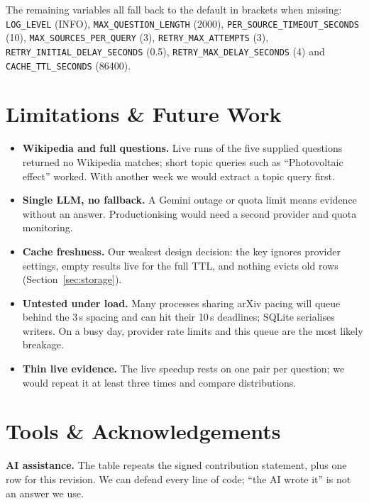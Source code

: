 \documentclass[11pt,a4paper]{article}
\newcommand{\cmd}[1]{\texttt{#1}}
\begin{document}
The remaining variables all fall back to the default in brackets when missing:
\cmd{LOG\_LEVEL} (INFO), \cmd{MAX\_QUESTION\_LENGTH} (2000),
\cmd{PER\_SOURCE\_TIMEOUT\_SECONDS} (10), \cmd{MAX\_SOURCES\_PER\_QUERY} (3),
\cmd{RETRY\_MAX\_ATTEMPTS} (3), \cmd{RETRY\_INITIAL\_DELAY\_SECONDS} (0.5),
\cmd{RETRY\_MAX\_DELAY\_SECONDS} (4) and \cmd{CACHE\_TTL\_SECONDS} (86400).

\section{Limitations \& Future Work}\label{sec:limits}

\begin{itemize}[leftmargin=*,itemsep=2pt]
\item \textbf{Wikipedia and full questions.} Live runs of the five supplied
  questions returned no Wikipedia matches; short topic queries such as
  ``Photovoltaic effect'' worked. With another week we would extract a topic query
  first.
\item \textbf{Single LLM, no fallback.} A Gemini outage or quota limit means
  evidence without an answer. Productionising would need a second provider and
  quota monitoring.
\item \textbf{Cache freshness.} Our weakest design decision: the key ignores
  provider settings, empty results live for the full TTL, and nothing evicts old
  rows (Section~\ref{sec:storage}).
\item \textbf{Untested under load.} Many processes sharing arXiv pacing will queue
  behind the 3\,s spacing and can hit their 10\,s deadlines; SQLite serialises
  writers. On a busy day, provider rate limits and this queue are the most likely
  breakage.
\item \textbf{Thin live evidence.} The live speedup rests on one pair per
  question; we would repeat it at least three times and compare distributions.
\end{itemize}

\section{Tools \& Acknowledgements}\label{sec:tools}

\textbf{AI assistance.} The table repeats the signed contribution statement, plus
one row for this revision. We can defend every line of code; ``the AI wrote it''
is not an answer we use.
\end{document}
